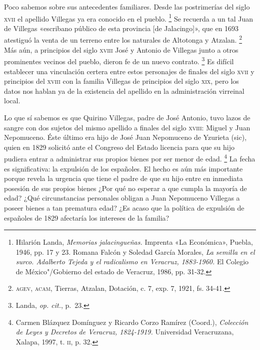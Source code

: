 \documentclass[14pt,twoside,final]{extbook} %
\let\oldfootnote\footnote
\renewcommand\footnote[1]{%
\oldfootnote{\hspace{1mm}#1}}
\begin{document}
Poco sabemos sobre sus antecedentes familiares. Desde las postrimerías del siglo \textsc{xvii} el apellido Villegas ya era conocido en el pueblo.\footnote{Hilarión Landa, \emph{Memorias jalacingueñas.} Imprenta «La Económica», Puebla, 1946, pp. 17 y 23. Romana Falcón y Soledad García Morales, \emph{La semilla en el surco. Adalberto Tejeda y el radicalismo en Veracruz, 1883-1960.} El Colegio de México"/Gobierno del estado de Veracruz, 1986, pp. 31-32.} Se recuerda a un tal Juan de Villegas «escribano público de esta provincia [de Jalacingo]», que en 1693 atestiguó la venta de un terreno entre los naturales de Altotonga y Atzalan.\footnote{\textsc{agev, acam}, Tierras, Atzalan, Dotación, c. 7, exp. 7, 1921, fs. 34-41.} Más aún, a principios del siglo \textsc{xviii} José y Antonio de Villegas junto a otros prominentes vecinos del pueblo, dieron fe de un nuevo contrato.\footnote{Landa, \emph{op. cit.}, p.\ 23.} Es difícil establecer una vinculación certera entre estos personajes de finales del siglo \textsc{xvii} y principios del \textsc{xviii} con la familia Villegas de principios del siglo \textsc{xix}, pero los datos nos hablan ya de la existencia del apellido en la administración virreinal local.

Lo que sí sabemos es que Quirino Villegas, padre de José Antonio, tuvo lazos de sangre con dos sujetos del mismo apellido a finales del siglo \textsc{xviii}: Miguel y Juan Nepomuceno. Éste último era hijo de José Juan Nepomuceno de Yzurieta (sic), quien en 1829 solicitó ante el Congreso del Estado licencia para que su hijo pudiera entrar a administrar sus propios bienes por ser menor de edad.\footnote{Carmen Blázquez Domínguez y Ricardo Corzo Ramírez (Coord.), \emph{Colección de Leyes y Decretos de Veracruz, 1824-1919.} Universidad Veracruzana, Xalapa, 1997, t. \textsc{ii}, p. 32.} La fecha es significativa: la expulsión de los españoles. El hecho es aún más importante porque revela la urgencia que tiene el padre de que su hijo entre en inmediata posesión de sus propios bienes ¿Por qué no esperar a que cumpla la mayoría de edad? ¿Qué circunstancias personales obligan a Juan Nepomuceno Villegas a poseer bienes a tan prematura edad? ¿Es acaso que la política de expulsión de españoles de 1829 afectaría los intereses de la familia?
\end{document}

